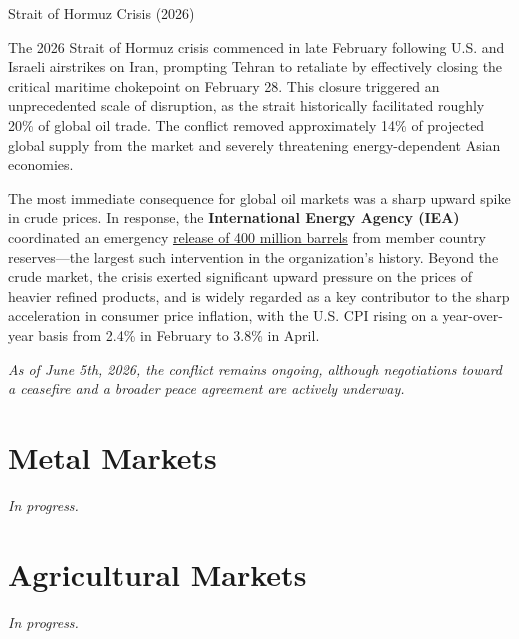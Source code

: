 \documentclass[10pt]{article}
\begin{document}
      \begin{core}[label=core:hormuz_crisis_2026]{Strait of Hormuz Crisis (2026)}

        The 2026 Strait of Hormuz crisis commenced in late February following U.S. and Israeli airstrikes on Iran, prompting Tehran to retaliate by effectively closing the critical maritime chokepoint on February 28. This closure triggered an unprecedented scale of disruption, as the strait historically facilitated roughly 20\% of global oil trade. The conflict removed approximately 14\% of projected global supply from the market and severely threatening energy-dependent Asian economies.


        The most immediate consequence for global oil markets was a sharp upward spike in crude prices. In response, the \textbf{International Energy Agency (IEA)} coordinated an emergency \href{https://www.iea.org/news/iea-member-countries-to-carry-out-largest-ever-oil-stock-release-amid-market-disruptions-from-middle-east-conflict}{release of 400 million barrels} from member country reserves---the largest such intervention in the organization's history. Beyond the crude market, the crisis exerted significant upward pressure on the prices of heavier refined products, and is widely regarded as a key contributor to the sharp acceleration in consumer price inflation, with the U.S. CPI rising on a year-over-year basis from 2.4\% in February to 3.8\% in April.

        \textit{As of June 5th, 2026, the conflict remains ongoing, although negotiations toward a ceasefire and a broader peace agreement are actively underway.}

      \end{core}

\section{Metal Markets}
  \label{sec:metal}

  \textit{In progress.}

\section{Agricultural Markets}
  \label{sec:agriculture}

  \textit{In progress.}
\end{document}
